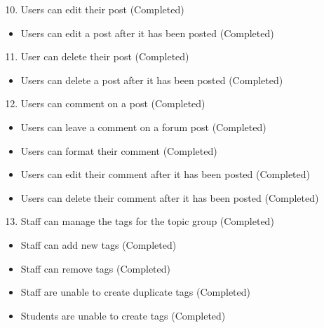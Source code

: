 \begin{enumerate}
    \setcounter{enumi}{9}
    \item Users can edit their post (Completed)
\end{enumerate}
\begin{itemize}
    \setlength{\itemindent}{1.5em}
    \item Users can edit a post after it has been posted (Completed)
\end{itemize}

\begin{enumerate}
    \setcounter{enumi}{10}
    \item User can delete their post (Completed)
\end{enumerate}
\begin{itemize}
    \setlength{\itemindent}{1.5em}
    \item Users can delete a post after it has been posted (Completed)
\end{itemize}

\begin{enumerate}
    \setcounter{enumi}{11}
    \item Users can comment on a post (Completed)
\end{enumerate}
\begin{itemize}
    \setlength{\itemindent}{1.5em}
    \item Users can leave a comment on a forum post (Completed)
    \item Users can format their comment (Completed)
    \item Users can edit their comment after it has been posted (Completed)
    \item Users can delete their comment after it has been posted (Completed)
\end{itemize}

\begin{enumerate}
    \setcounter{enumi}{12}
    \item Staff can manage the tags for the topic group (Completed)
\end{enumerate}
\begin{itemize}
    \setlength{\itemindent}{1.5em}
    \item Staff can add new tags (Completed)
    \item Staff can remove tags (Completed)
    \item Staff are unable to create duplicate tags (Completed)
    \item Students are unable to create tags (Completed)
\end{itemize}

